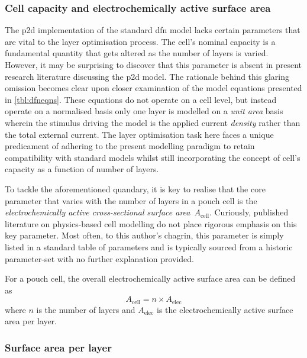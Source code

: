 \subsubsection*{Cell capacity and electrochemically active surface area}

The  \gls{p2d} implementation  of  the standard  \gls{dfn}  model lacks  certain
parameters that are vital to the  layer optimisation process. The cell's nominal
capacity is a fundamental quantity that gets  altered as the number of layers is
varied. However, it may be surprising  to discover that this parameter is absent
in present  research literature  discussing the  \gls{p2d} model.  The rationale
behind this glaring omission becomes clear  upon closer examination of the model
equations presented in  \cref{tbl:dfneqns}. These equations do not  operate on a
cell level, but  instead operate on a  normalised basis \ie{} only  one layer is
modelled on a  \emph{unit area} basis wherein the stimulus  driving the model is
the applied current  \emph{density} rather than the total  external current. The
layer  optimisation task  here faces  a unique  predicament of  adhering to  the
present modelling paradigm  to retain compatibility with  standard models whilst
still incorporating  the concept of cell's  capacity as a function  of number of
layers.

To  tackle the  aforementioned quandary,  it  is key  to realise  that the  core
parameter  that  varies with  the  number  of layers  in  a  pouch cell  is  the
\emph{electrochemically  active  cross-sectional surface  area}~$A_\text{cell}$.
Curiously, published  literature on  physics-based cell  modelling do  not place
rigorous emphasis on  this key parameter. Most often, to  this author's chagrin,
this  parameter is  simply  listed in  a  standard table  of  parameters and  is
typically  sourced from  a historic  parameter-set with  no further  explanation
provided.

For  a pouch  cell, the  overall electrochemically  active surface  area can  be
defined as
\begin{equation}\label{eq:overallarea}
    A_\text{cell} = n \times A_\text{elec}
\end{equation}
where $n$ is  the number of layers and $A_\text{elec}$  is the electrochemically
active surface area per layer.

\subsubsection*{Surface area per layer}\label{sec:surfareaperlayer}


